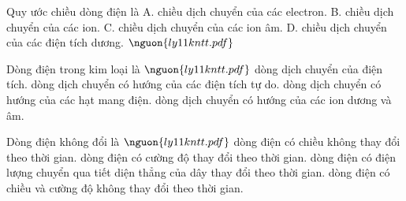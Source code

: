 

\begin{ex}
Quy ước chiều dòng điện là A. chiều dịch chuyển của các electron. B. chiều dịch chuyển của các ion. C. chiều dịch chuyển của các ion âm. D. chiều dịch chuyển của các điện tích dương. $\nguon{ly11 kntt.pdf}$
\choiceTF

\end{ex}

\begin{ex}
Dòng điện trong kim loại là $\nguon{ly11 kntt.pdf}$
\choice
{dòng dịch chuyển của điện tích.}
{\True dòng dịch chuyển có hướng của các điện tích tự do.}
{dòng dịch chuyển có hướng của các hạt mang điện.}
{dòng dịch chuyển có hướng của các ion dương và âm.}
\end{ex}


\begin{ex}
Dòng điện không đổi là $$
\choice
{dòng điện có chiều không thay đổi theo thời gian.}
{dòng điện có cường độ thay đổi theo thời gian.}
{dòng điện có điện lượng chuyển qua tiết diện thẳng của dây thay đổi theo thời gian.}
{\True dòng điện có chiều và cường độ không thay đổi theo thời gian.}
\end{ex}

